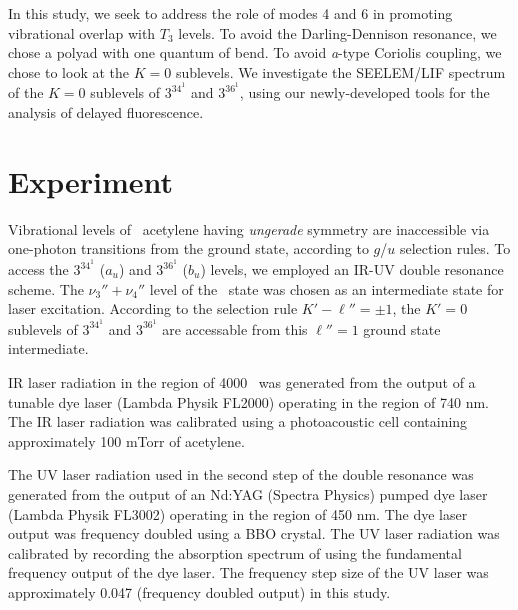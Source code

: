 \documentclass[12pt]{mitthesis}
\begin{document}
In this study, we seek to address the role of modes 4 and 6 in
promoting vibrational overlap with $T_3$ levels.  To avoid the
Darling-Dennison resonance, we chose a polyad with one quantum of
bend.  To avoid \emph{a}-type Coriolis coupling, we chose to look at
the $K=0$ sublevels.  We investigate the SEELEM/LIF spectrum of the
$K=0$ sublevels of $3^34^1$ and $3^36^1$, using our newly-developed
tools for the analysis of delayed fluorescence.




























\section{Experiment}

Vibrational levels of \astate\ acetylene having \emph{ungerade}
symmetry are inaccessible via one-photon transitions from the ground
state, according to $g$/$u$ selection rules.  To access the $3^34^1$
($a_u$) and $3^36^1$ ($b_u$) levels, we employed an IR-UV double
resonance scheme.  The $\nu_3''+\nu_4''$ level of the \xstate\ state
was chosen as an intermediate state for laser excitation.  According
to the selection rule $K'-\ell'' = \pm 1$, the $K'=0$ sublevels of
$3^34^1$ and $3^36^1$ are accessable from this $\ell''=1$ ground state
intermediate.

IR laser radiation in the region of 4000 \rcm\ was generated from the
output of a tunable dye laser (Lambda Physik FL2000) operating in the
region of 740 nm.    The IR laser radiation was
calibrated using a photoacoustic cell containing approximately 100
mTorr of acetylene.

The UV laser radiation used in the second step of the double resonance
was generated from the output of an Nd:YAG (Spectra Physics) pumped
dye laser (Lambda Physik FL3002) operating in the region of 450 nm.
The dye laser output was frequency doubled using a BBO crystal.  The
UV laser radiation was calibrated by recording the absorption spectrum
of  using the fundamental frequency output of the dye laser.
The frequency step size of the UV laser was approximately 0.047 \rcm
(frequency doubled output) in this study.
\end{document}
